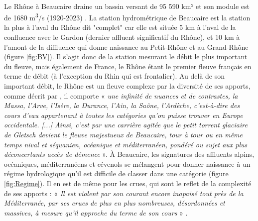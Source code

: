 \documentclass[11pt]{article}
\begin{document}
	\paragraph{} Le Rhône à Beaucaire draine un bassin versant de 95 590 km² et son module est de 1680 m\textsuperscript{3}/s (1920-2023) \citep{medd_banque_2021}. La station hydrométrique de Beaucaire est la station la plus à l'aval du Rhône dit "complet" car elle est située 5 km à l'aval de la confluence avec le Gardon (dernier affluent significatif du Rhône), et 10 km à l'amont de la diffluence qui donne naissance au Petit-Rhône et au Grand-Rhône (figure \ref{fig:BV}). Il s'agit donc de la station mesurant le débit le plus important du fleuve, mais également de France, le Rhône étant le premier fleuve français en terme de débit (à l'exception du Rhin qui est frontalier). Au delà de son important débit, le Rhône est un fleuve complexe par la diversité de ses apports, comme décrit par \citet{parde_regime_1925}, il comporte « \textit{ une infinité de nuances et de contrastes, la Massa, l'Arve, l'Isère, la Durance, l'Ain, la Saône, l'Ardèche, c'est-à-dire des cours d'eau appartenant à toutes les catégories qu'on puisse trouver en Europe occidentale. [...] Ainsi, c'est par une carrière agitée que le petit torrent glaciaire de Gletsch devient le fleuve majestueux de Beaucaire, tour à tour ou en même temps nival et séquanien, océanique et méditerranéen, pondéré ou sujet aux plus déconcertants accès de démence} ». À Beaucaire, les signatures des affluents alpins, océaniques, méditerranéens et cévenols se mélangent pour donner naissance à un régime hydrologique qu'il est difficile de classer dans une catégorie (figure \ref{fig:Regime}). Il en est de même pour les crues, qui sont le reflet de la complexité de ses apports : « \textit{Il est violent par son courant encore inapaisé tout près de la Méditerranée, par ses crues de plus en plus nombreuses, désordonnées et massives, à mesure qu'il approche du terme de son cours} » \citep{parde_regime_1925}. 
\end{document}
